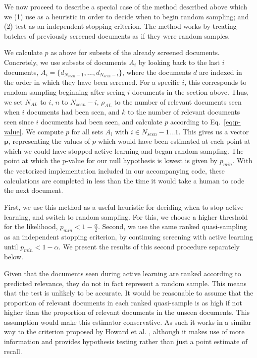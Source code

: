 \documentclass{bmcart}
\begin{document}
	We now proceed to describe a special case of the method described above which we (1) use as a heuristic in order to decide when to begin random sampling; and (2) test as an independent stopping criterion. The method works by treating batches of previously screened documents as if they were random samples.
	
	We calculate $p$ as above for subsets of the already screened documents. Concretely, we use subsets of documents $A_i$ by looking back to the last $i$ documents, $A_i = \{d_{N_{seen} - 1}, ..., d_{N_{seen} - i}\}$, where the documents $d$ are indexed in the order in which they have been screened. For a specific $i$, this corresponds to  random sampling beginning after seeing $i$ documents in the section above.
	Thus, we set 
	$N_{AL}$ to $i$, 
	$n$ to $N_{seen}-i$, 
	$\rho_{AL}$ to the number of relevant documents seen when $i$ documents had been seen,
	and $k$ to the number of relevant documents seen since $i$ documents had been seen, and calculate $p$ according to Eq.~\ref{eq:p-value}.
	We compute $p$ for all sets $A_i$ with $i \in {N_{seen}-1 \dots 1}$.
	This gives us a vector $\bm{p}$, representing the values of $p$ which would have been estimated at each point at which we could have stopped active learning and began random sampling. The point at which the p-value for our null hypothesis is lowest is given by $p_{min}$. With the vectorized implementation included in our accompanying code, these calculations are completed in less than the time it would take a human to code the next document.
	
	First, we use this method as a useful heuristic for deciding when to stop active learning, and switch to random sampling. For this, we choose a higher threshold for the likelihood, $p_{min} < 1-\frac{\alpha}{2}$. Second, we use the same ranked quasi-sampling as an independent stopping criterion, by continuing screening with active learning until $p_{min} < 1 - \alpha$. We present the results of this second procedure separately below.
	
	Given that the documents seen during active learning are ranked according to predicted relevance, they do not in fact represent a random sample. This means that the test is unlikely to be accurate. It would be reasonable to assume that the proportion of relevant documents in each ranked quasi-sample is as high if not higher than the proportion of relevant documents in the unseen documents. This assumption would make this estimator conservative. As such it works in a similar way to the criterion proposed by Howard et al. \cite{Howard2020}, although it makes use of more information and provides hypothesis testing rather than just a point estimate of recall.
	
\end{document}
